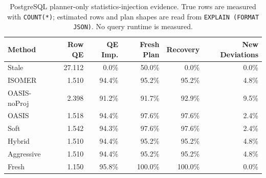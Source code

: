 \begin{table}[t]
  \centering
  \small
  \caption{PostgreSQL planner-only statistics-injection evidence. True rows are measured with \texttt{COUNT(*)}; estimated rows and plan shapes are read from \texttt{EXPLAIN (FORMAT JSON)}. No query runtime is measured.}
  \label{tab:postgres_planner_stats_injection}
  \setlength{\tabcolsep}{4pt}
  \begin{tabular}{lrrrrr}
    \toprule
    Method & Row QE & QE Imp. & Fresh Plan & Recovery & New Deviations \\
    \midrule
    Stale & 27.112 & 0.0\% & 50.0\% & 0.0\% & 0.0\% \\
    ISOMER & 1.510 & 94.4\% & 95.2\% & 95.2\% & 4.8\% \\
    OASIS-noProj & 2.398 & 91.2\% & 91.7\% & 92.9\% & 9.5\% \\
    OASIS & 1.518 & 94.4\% & 97.6\% & 97.6\% & 2.4\% \\
    Soft & 1.542 & 94.3\% & 97.6\% & 97.6\% & 2.4\% \\
    Hybrid & 1.510 & 94.4\% & 95.2\% & 95.2\% & 4.8\% \\
    Aggressive & 1.510 & 94.4\% & 95.2\% & 95.2\% & 4.8\% \\
    Fresh & 1.150 & 95.8\% & 100.0\% & 100.0\% & 0.0\% \\
    \bottomrule
  \end{tabular}
\end{table}
